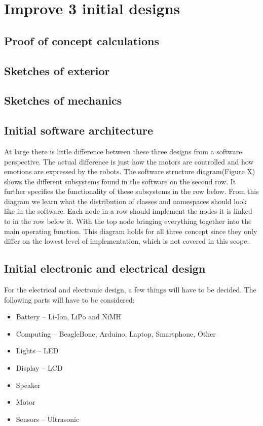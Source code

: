 \documentclass[11pt,twoside,a4paper]{report}
\begin{document}
\chapter{Improve 3 initial designs}
\section{Proof of concept calculations}
\section{Sketches of exterior}
\section{Sketches of mechanics}
\section{Initial software architecture}

At large there is little difference between these three designs from a software perspective. The actual difference is just how the motors are controlled and how emotions are expressed by the robots. 
The software structure diagram(Figure X) shows the different subsystems found in the software on the second row. It further specifies the functionality of these subsystems in the row below. From this diagram we learn what the distribution of classes and namespaces should look like in the software. Each node in a row should implement the nodes it is linked to in the row below it. With the top node bringing everything together into the main operating function. This diagram holds for all three concept since they only differ on the lowest level of implementation, which is not covered in this scope.

\section{Initial electronic and electrical design}
For the electrical and electronic design, a few things will have to be decided. The following parts will have to be considered: 
\begin{itemize}
\item Battery -- Li-Ion, LiPo and NiMH
\item Computing -- BeagleBone, Arduino, Laptop, Smartphone, Other
\item Lights -- LED
\item Display -- LCD
\item Speaker
\item Motor
\item Sensors -- Ultrasonic
\end{itemize}
\end{document}
